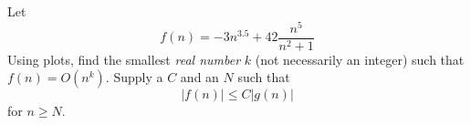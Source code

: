 Let
\[
f(n) = -3n^{3.5} + 42 \frac{n^5}{n^2 + 1}
\]
Using plots, 
find the smallest \textit{real number} $k$ (not necessarily an integer) 
such that $f(n) = O(n^k)$.
Supply a $C$ and an $N$ such that 
\[
|f(n)| \leq C |g(n)|
\]
for $n \geq N$.
